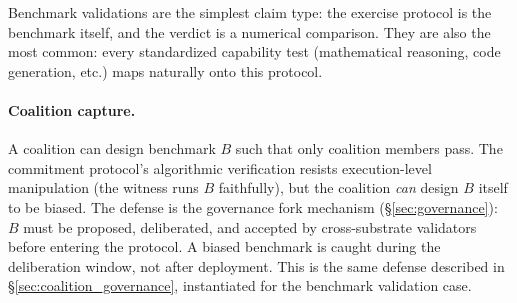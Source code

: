 Benchmark validations are the simplest claim type: the exercise protocol
is the benchmark itself, and the verdict is a numerical comparison.
They are also the most common: every standardized capability test
(mathematical reasoning, code generation, etc.) maps naturally onto this
protocol.

\paragraph{Coalition capture.}
A coalition can design benchmark $B$ such that only coalition members
pass.  The commitment protocol's algorithmic verification resists
execution-level manipulation (the witness runs $B$ faithfully), but the
coalition \emph{can} design $B$ itself to be biased.  The defense is the
governance fork mechanism (\S\ref{sec:governance}): $B$ must be
proposed, deliberated, and accepted by cross-substrate validators before
entering the protocol.  A biased benchmark is caught during the
deliberation window, not after deployment.  This is the same defense
described in \S\ref{sec:coalition_governance}, instantiated for the
benchmark validation case.

